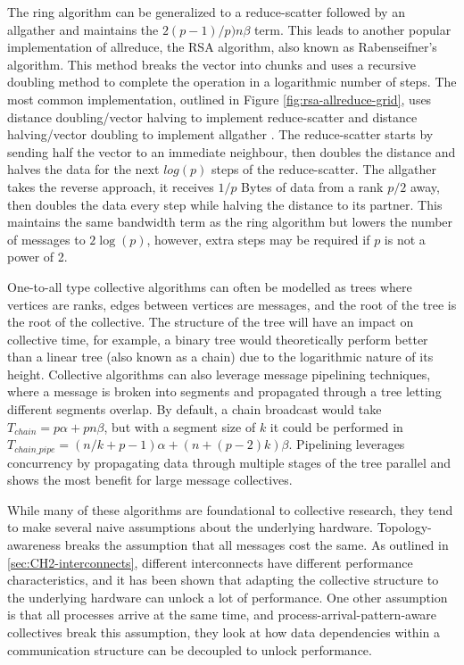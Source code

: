 The ring algorithm can be generalized to a reduce-scatter followed by an allgather and maintains the $2(p-1)/p)n\beta$ term.
This leads to another popular implementation of allreduce, the \gls{RSA} algorithm, also known as Rabenseifner's algorithm.
This method breaks the vector into chunks and uses a recursive doubling method to complete the operation in a logarithmic number of steps.
The most common implementation, outlined in Figure \ref{fig:rsa-allreduce-grid}, uses distance doubling/vector halving to implement reduce-scatter and distance halving/vector doubling to implement allgather \cite{Rabenseifner2004OptOfCollRedOps}.
The reduce-scatter starts by sending half the vector to an immediate neighbour, then doubles the distance and halves the data for the next $log(p)$ steps of the reduce-scatter.
The allgather takes the reverse approach, it receives $1/p$ Bytes of data from a rank $p/2$ away, then doubles the data every step while halving the distance to its partner.
This maintains the same bandwidth term as the ring algorithm but lowers the number of messages to $2\log(p)$, however, extra steps may be required if $p$ is not a power of 2.


One-to-all type collective algorithms can often be modelled as trees where vertices are ranks, edges between vertices are messages, and the root of the tree is the root of the collective.
The structure of the tree will have an impact on collective time, for example, a binary tree would theoretically perform better than a linear tree (also known as a chain) due to the logarithmic nature of its height.
Collective algorithms can also leverage message pipelining techniques, where a message is broken into segments and propagated through a tree letting different segments overlap.
By default, a chain broadcast would take $T_{chain}=p\alpha+pn\beta$, but with a segment size of $k$ it could be performed in $T_{chain\_pipe}=(n/k+p-1)\alpha+(n+(p-2)k)\beta$.
Pipelining leverages concurrency by propagating data through multiple stages of the tree parallel and shows the most benefit for large message collectives.

While many of these algorithms are foundational to collective research, they tend to make several naive assumptions about the underlying hardware.
Topology-awareness breaks the assumption that all messages cost the same.
As outlined in \ref{sec:CH2-interconnects}, different interconnects have different performance characteristics, and it has been shown that adapting the collective structure to the underlying hardware can unlock a lot of performance. 
One other assumption is that all processes arrive at the same time, and process-arrival-pattern-aware collectives break this assumption, they look at how data dependencies within a communication structure can be decoupled to unlock performance.

